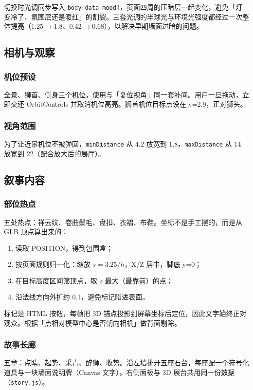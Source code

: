 \documentclass[UTF8,a4paper,11pt]{ctexart}
\begin{document}
切换时光调同步写入 \texttt{body[data-mood]}，页面四周的压暗层一起变化，避免「灯变冷了、氛围层还是暖红」的割裂。三套光调的半球光与环境光强度都经过一次整体提亮（1.25$\rightarrow$1.8、0.42$\rightarrow$0.68），以解决早期墙面过暗的问题。

\subsection{相机与观察}

\subsubsection{机位预设}
全景、狮首、侧身三个机位，使用与「复位视角」同一套补间。用户一旦拖动，立即交还 OrbitControls 并取消机位高亮。狮首机位目标点设在 y=2.9，正对狮头。

\subsubsection{视角范围}
为了让近景机位不被弹回，\texttt{minDistance} 从 4.2 放宽到 1.8，\texttt{maxDistance} 从 14 放宽到 22（配合放大后的展厅）。

\subsection{叙事内容}

\subsubsection{部位热点}
五处热点：祥云纹、卷曲鬃毛、盘扣、衣褶、布鞋。坐标不是手工摆的，而是从 GLB 顶点算出来的：

\begin{enumerate}[itemsep=2pt]
  \item 读取 POSITION，得到包围盒；
  \item 按页面规则归一化：缩放 $s = 3.25 / h$，X/Z 居中，脚底 y=0；
  \item 在目标高度区间筛顶点，取 $z$ 最大（最靠前）的点；
  \item 沿法线方向外扩约 0.1，避免标记陷进表面。
\end{enumerate}

标记是 HTML 按钮，每帧把 3D 锚点投影到屏幕坐标后定位，因此文字始终正对观众。根据「点相对模型中心是否朝向相机」做背面剔除。

\subsubsection{故事长廊}
五章：点睛、起势、采青、醉狮、收势。沿左墙排开五座石台，每座配一个符号化道具与一块墙面说明牌（Canvas 文字）。右侧面板与 3D 展台共用同一份数据（\texttt{story.js}）。
\end{document}
